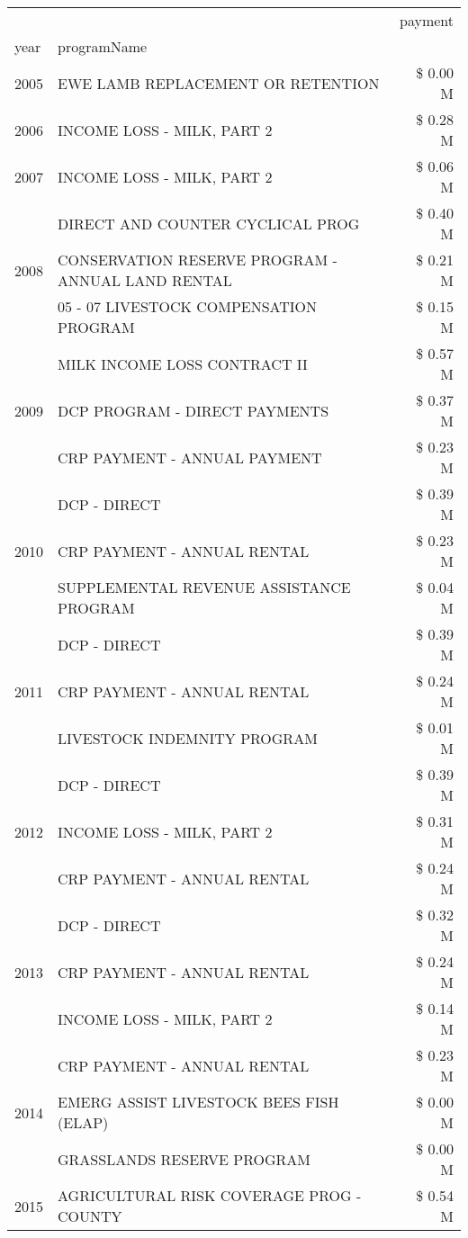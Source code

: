 \begin{tabular}{llr}
\toprule
 &  & payment \\
year & programName &  \\
\midrule
2005 & EWE LAMB REPLACEMENT OR RETENTION & \$ 0.00 M \\
\cline{1-3}
2006 & INCOME LOSS - MILK, PART 2 & \$ 0.28 M \\
\cline{1-3}
2007 & INCOME LOSS - MILK, PART 2 & \$ 0.06 M \\
\cline{1-3}
\multirow[t]{3}{*}{2008} & DIRECT AND COUNTER CYCLICAL PROG & \$ 0.40 M \\
 & CONSERVATION RESERVE PROGRAM - ANNUAL LAND RENTAL & \$ 0.21 M \\
 & 05 - 07 LIVESTOCK COMPENSATION PROGRAM & \$ 0.15 M \\
\cline{1-3}
\multirow[t]{3}{*}{2009} & MILK INCOME LOSS CONTRACT II & \$ 0.57 M \\
 & DCP PROGRAM - DIRECT PAYMENTS & \$ 0.37 M \\
 & CRP PAYMENT - ANNUAL PAYMENT & \$ 0.23 M \\
\cline{1-3}
\multirow[t]{3}{*}{2010} & DCP - DIRECT & \$ 0.39 M \\
 & CRP PAYMENT - ANNUAL RENTAL & \$ 0.23 M \\
 & SUPPLEMENTAL REVENUE ASSISTANCE PROGRAM & \$ 0.04 M \\
\cline{1-3}
\multirow[t]{3}{*}{2011} & DCP - DIRECT & \$ 0.39 M \\
 & CRP PAYMENT - ANNUAL RENTAL & \$ 0.24 M \\
 & LIVESTOCK INDEMNITY PROGRAM & \$ 0.01 M \\
\cline{1-3}
\multirow[t]{3}{*}{2012} & DCP - DIRECT & \$ 0.39 M \\
 & INCOME LOSS - MILK, PART 2 & \$ 0.31 M \\
 & CRP PAYMENT - ANNUAL RENTAL & \$ 0.24 M \\
\cline{1-3}
\multirow[t]{3}{*}{2013} & DCP - DIRECT & \$ 0.32 M \\
 & CRP PAYMENT - ANNUAL RENTAL & \$ 0.24 M \\
 & INCOME LOSS - MILK, PART 2 & \$ 0.14 M \\
\cline{1-3}
\multirow[t]{3}{*}{2014} & CRP PAYMENT - ANNUAL RENTAL & \$ 0.23 M \\
 & EMERG ASSIST LIVESTOCK BEES FISH (ELAP) & \$ 0.00 M \\
 & GRASSLANDS RESERVE PROGRAM & \$ 0.00 M \\
\cline{1-3}
\multirow[t]{3}{*}{2015} & AGRICULTURAL RISK COVERAGE PROG - COUNTY & \$ 0.54 M \\

\end{tabular}
